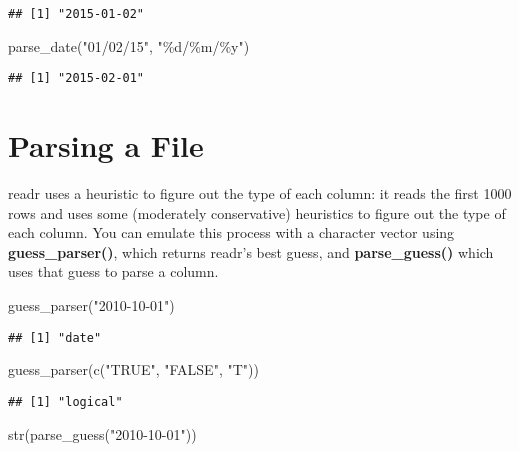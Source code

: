 \documentclass[
]{article}
\newenvironment{Shaded}{\begin{snugshade}}{\end{snugshade}}
\newcommand{\FunctionTok}[1]{\textcolor[rgb]{0.00,0.00,0.00}{#1}}
\newcommand{\NormalTok}[1]{#1}
\newcommand{\StringTok}[1]{\textcolor[rgb]{0.31,0.60,0.02}{#1}}
\begin{document}
\begin{verbatim}
## [1] "2015-01-02"
\end{verbatim}

\begin{Shaded}
\begin{Highlighting}[]
\FunctionTok{parse\_date}\NormalTok{(}\StringTok{"01/02/15"}\NormalTok{, }\StringTok{"\%d/\%m/\%y"}\NormalTok{)}
\end{Highlighting}
\end{Shaded}

\begin{verbatim}
## [1] "2015-02-01"
\end{verbatim}

\hypertarget{parsing-a-file}{%
\section{\texorpdfstring{\textbf{Parsing a
File}}{Parsing a File}}\label{parsing-a-file}}

readr uses a heuristic to figure out the type of each column: it reads
the first 1000 rows and uses some (moderately conservative) heuristics
to figure out the type of each column. You can emulate this process with
a character vector using \textbf{guess\_parser()}, which returns readr's
best guess, and \textbf{parse\_guess()} which uses that guess to parse a
column.

\begin{Shaded}
\begin{Highlighting}[]
\FunctionTok{guess\_parser}\NormalTok{(}\StringTok{"2010{-}10{-}01"}\NormalTok{)}
\end{Highlighting}
\end{Shaded}

\begin{verbatim}
## [1] "date"
\end{verbatim}

\begin{Shaded}
\begin{Highlighting}[]
\FunctionTok{guess\_parser}\NormalTok{(}\FunctionTok{c}\NormalTok{(}\StringTok{"TRUE"}\NormalTok{, }\StringTok{"FALSE"}\NormalTok{, }\StringTok{"T"}\NormalTok{))}
\end{Highlighting}
\end{Shaded}

\begin{verbatim}
## [1] "logical"
\end{verbatim}

\begin{Shaded}
\begin{Highlighting}[]
\FunctionTok{str}\NormalTok{(}\FunctionTok{parse\_guess}\NormalTok{(}\StringTok{"2010{-}10{-}01"}\NormalTok{))}
\end{Highlighting}
\end{Shaded}
\end{document}
